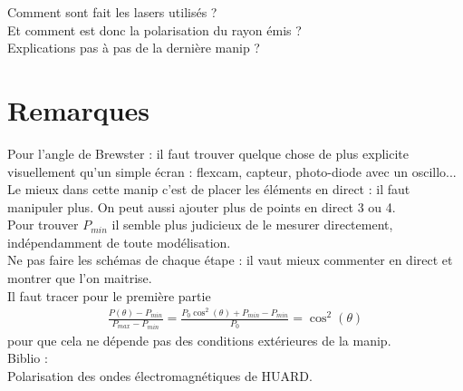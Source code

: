 \documentclass[12pt,prb,aps,epsf]{report}
\begin{document}
Comment sont fait les lasers utilisés ?\\

Et comment est donc la polarisation du rayon émis ?\\

Explications pas à pas de la dernière manip ?


\section*{Remarques}
Pour l'angle de Brewster : il faut trouver quelque chose de plus explicite visuellement qu'un simple écran : flexcam, capteur, photo-diode avec un oscillo...\\
Le mieux dans cette manip c'est de placer les éléments en direct : il faut manipuler plus. On peut aussi ajouter plus de points en direct 3 ou 4.\\
Pour trouver $P_{min}$ il semble plus judicieux de le mesurer directement, indépendamment de toute modélisation.\\ 
Ne pas faire les schémas de chaque étape : il vaut mieux commenter en direct et montrer que l'on maitrise.\\
Il faut tracer pour le première partie 
\begin{eqnarray}
\frac{P(\theta)-P_{min}}{P_{max}-P_{min}} = \frac{P_0\cos^2(\theta) + P_{min}-P_{min}}{P_0} = \cos^2(\theta)
\end{eqnarray}
pour que cela ne dépende pas des conditions extérieures de la manip.\\

Biblio :\\

Polarisation des ondes électromagnétiques de HUARD.
\end{document}
